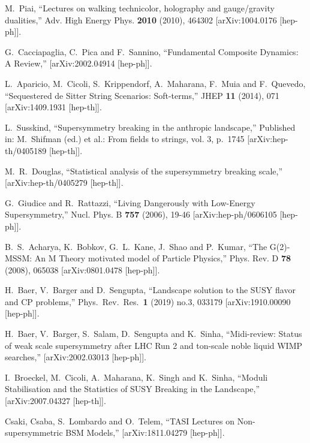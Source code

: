 \documentclass[12pt]{article}
\numberwithin{equation}{section}
\begin{document}
\begin{thebibliography}{999}
M.~Piai, ``Lectures on walking technicolor, holography and gauge/gravity dualities,''
Adv. High Energy Phys. \textbf{2010} (2010), 464302
[arXiv:1004.0176 [hep-ph]].  

G.~Cacciapaglia, C.~Pica and F.~Sannino,
``Fundamental Composite Dynamics: A Review,''
[arXiv:2002.04914 [hep-ph]].

L.~Aparicio, M.~Cicoli, S.~Krippendorf, A.~Maharana, F.~Muia and F.~Quevedo,
``Sequestered de Sitter String Scenarios: Soft-terms,''
JHEP \textbf{11} (2014), 071
[arXiv:1409.1931 [hep-th]].

L.~Susskind,
``Supersymmetry breaking in the anthropic landscape,''
Published in: M.~Shifman (ed.) et al.: From fields to strings, vol. 3, p.~1745 [arXiv:hep-th/0405189 [hep-th]]. 
  
M.~R.~Douglas,
``Statistical analysis of the supersymmetry breaking scale,''
[arXiv:hep-th/0405279 [hep-th]]. 

G.~Giudice and R.~Rattazzi,
``Living Dangerously with Low-Energy Supersymmetry,''
Nucl. Phys. B \textbf{757} (2006), 19-46
[arXiv:hep-ph/0606105 [hep-ph]].

B.~S.~Acharya, K.~Bobkov, G.~L.~Kane, J.~Shao and P.~Kumar,
``The G(2)-MSSM: An M Theory motivated model of Particle Physics,''
Phys. Rev. D \textbf{78} (2008), 065038
[arXiv:0801.0478 [hep-ph]].

H.~Baer, V.~Barger and D.~Sengupta,
``Landscape solution to the SUSY flavor and CP problems,''
Phys.\ Rev.\ Res.\  \textbf{1} (2019) no.3, 033179
[arXiv:1910.00090 [hep-ph]].

H.~Baer, V.~Barger, S.~Salam, D.~Sengupta and K.~Sinha,
``Midi-review: Status of weak scale supersymmetry after LHC Run 2 and ton-scale noble liquid WIMP searches,''
[arXiv:2002.03013 [hep-ph]].

I.~Broeckel, M.~Cicoli, A.~Maharana, K.~Singh and K.~Sinha, ``Moduli Stabilisation and the Statistics of SUSY Breaking in the Landscape,''
[arXiv:2007.04327 [hep-th]].

Csaki, Csaba, S.~Lombardo and O.~Telem,
``TASI Lectures on Non-supersymmetric BSM Models,''
[arXiv:1811.04279 [hep-ph]].


\end{thebibliography}
\end{document}
